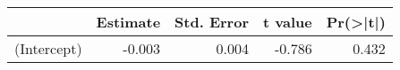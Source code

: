 
\begin{tabular}{l|r|r|r|r}
\hline
  & Estimate & Std. Error & t value & Pr(>|t|)\\
\hline
(Intercept) & -0.003 & 0.004 & -0.786 & 0.432\\
\hline
\end{tabular}
